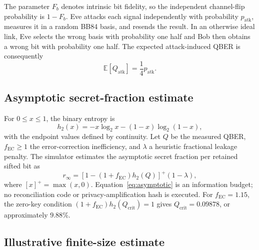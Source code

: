 \documentclass[conference]{IEEEtran}
\begin{document}
The parameter \(F_b\) denotes intrinsic bit fidelity, so the independent
channel-flip probability is \(1-F_b\). Eve attacks each signal independently
with probability \(p_{\mathrm{atk}}\), measures it in a random BB84 basis, and
resends the result. In an otherwise ideal link, Eve selects the wrong basis
with probability one half and Bob then obtains a wrong bit with probability
one half. The expected attack-induced QBER is consequently
\begin{equation}
\mathbb{E}[Q_{\mathrm{atk}}]=\frac{1}{4}p_{\mathrm{atk}}.
\label{eq:attack}
\end{equation}

\subsection{Asymptotic secret-fraction estimate}

For \(0\leq x\leq1\), the binary entropy is
\begin{equation}
h_2(x)=-x\log_2x-(1-x)\log_2(1-x),
\label{eq:entropy}
\end{equation}
with the endpoint values defined by continuity. Let \(Q\) be the measured
QBER, \(f_{\mathrm{EC}}\geq1\) the error-correction inefficiency, and
\(\lambda\) a heuristic fractional leakage penalty. The simulator estimates
the asymptotic secret fraction per retained sifted bit as
\begin{equation}
r_{\infty}
=
\left[1-(1+f_{\mathrm{EC}})h_2(Q)\right]^+(1-\lambda),
\label{eq:asymptotic}
\end{equation}
where \([x]^+=\max(x,0)\). Equation~\eqref{eq:asymptotic} is an information
budget; no reconciliation code or privacy-amplification hash is executed.
For \(f_{\mathrm{EC}}=1.15\), the zero-key condition
\((1+f_{\mathrm{EC}})h_2(Q_{\mathrm{crit}})=1\) gives
\(Q_{\mathrm{crit}}=0.09878\), or approximately \(9.88\%\).

\subsection{Illustrative finite-size estimate}
\end{document}
